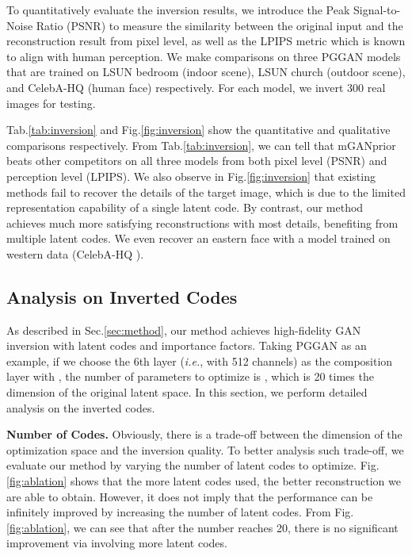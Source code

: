 \documentclass[10pt,twocolumn,letterpaper]{article}
\begin{document}
To quantitatively evaluate the inversion results, we introduce the Peak Signal-to-Noise Ratio (PSNR) to measure the similarity between the original input and the reconstruction result from pixel level, as well as the LPIPS metric \cite{zhang2018unreasonable} which is known to align with human perception.
We make comparisons on three PGGAN \cite{pggan} models that are trained on LSUN bedroom (indoor scene), LSUN church (outdoor scene), and CelebA-HQ (human face) respectively.
For each model, we invert 300 real images for testing.


Tab.\ref{tab:inversion} and Fig.\ref{fig:inversion} show the quantitative and qualitative comparisons respectively.
From Tab.\ref{tab:inversion}, we can tell that mGANprior beats other competitors on all three models from both pixel level (PSNR) and perception level (LPIPS).
We also observe in Fig.\ref{fig:inversion} that existing methods fail to recover the details of the target image, which is due to the limited representation capability of a single latent code.
By contrast, our method achieves much more satisfying reconstructions with most details, benefiting from multiple latent codes.
We even recover an eastern face with a model trained on western data (CelebA-HQ \cite{pggan}).


\subsection{Analysis on Inverted Codes}\label{subsec:analysis-on-inverted-codes}
As described in Sec.\ref{sec:method}, our method achieves high-fidelity GAN inversion with  latent codes and  importance factors.
Taking PGGAN as an example, if we choose the 6th layer (\emph{i.e.}, with 512 channels) as the composition layer with , the number of parameters to optimize is , which is 20 times the dimension of the original latent space.
In this section, we perform detailed analysis on the inverted codes.


\vspace{2pt}\noindent\textbf{Number of Codes.}
Obviously, there is a trade-off between the dimension of the optimization space and the inversion quality.
To better analysis such trade-off, we evaluate our method by varying the number of latent codes to optimize.
Fig.\ref{fig:ablation} shows that the more latent codes used, the better reconstruction we are able to obtain.
However, it does not imply that the performance can be infinitely improved by increasing the number of latent codes.
From Fig.\ref{fig:ablation}, we can see that after the number reaches 20, there is no significant improvement via involving more latent codes.
\end{document}

